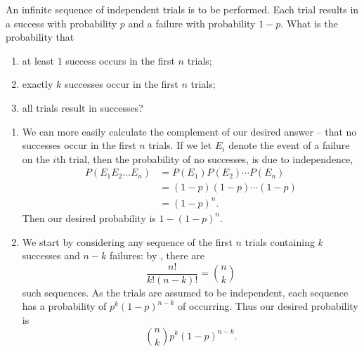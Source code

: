 \begin{changebar}
    \begin{example}
        An infinite sequence of independent trials is to be performed. Each trial results in a success with probability $p$ and a failure with probability $1 - p$. What is the probability that \begin{enumerate}[label=(\alph*)]
            \item at least $1$ success occurs in the first $n$ trials;
            \item exactly $k$ successes occur in the first $n$ trials;
            \item all trials result in successes?
        \end{enumerate}
    \end{example}
    \begin{solution}\hfill
        \begin{enumerate}[label=(\alph*)]
            \item We can more easily calculate the complement of our desired answer -- that no successes occur in the first $n$ trials. If we let $E_i$ denote the event of a failure on the $i$th trial, then the probability of no successes, is due to independence, \[
                \begin{aligned}
                    P(E_1E_2\dots E_n) &= P(E_1)P(E_2)\cdots P(E_n) \\
                    &= (1-p)(1-p)\cdots(1-p) \\
                    &= (1-p)^n. 
                \end{aligned}
            \] Then our desired probability is $1 - (1-p)^n$.

            \item We start by considering any sequence of the first $n$ trials containing $k$ successes and $n - k$ failures: by , there are \[
                \frac{n!}{k!(n-k)!} = \binom{n}{k}    
            \] such sequences. As the trials are assumed to be independent, each sequence has a probability of $p^k(1-p)^{n-k}$ of occurring. Thus our desired probability is \[
                \binom{n}{k}p^k(1-p)^{n-k}.    
            \]


\end{enumerate}
\end{solution}
\end{changebar}
